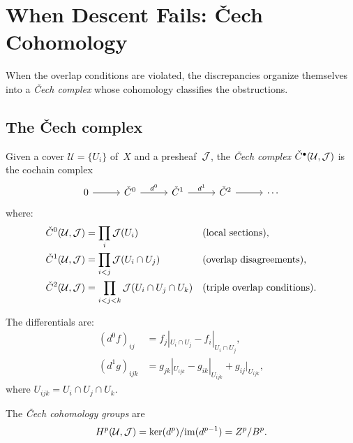 \documentclass[11pt]{article}
\begin{document}
\section{When Descent Fails: \v{C}ech Cohomology}\label{sec:cech}

When the overlap conditions are violated, the discrepancies organize
themselves into a \emph{\v{C}ech complex} whose cohomology classifies the
obstructions.

\subsection{The \v{C}ech complex}

\begin{definition}\label{def:cech}
Given a cover $\mathcal{U} = \{U_i\}$ of~$X$ and a presheaf~$\mathcal{J}$, the
\emph{\v{C}ech complex} $\check{C}^{\bullet}(\mathcal{U}, \mathcal{J})$ is the cochain
complex
\[
\begin{tikzcd}[column sep=2.8em]
0 \ar[r] &
\Cech^0 \ar[r, "d^0"] &
\Cech^1 \ar[r, "d^1"] &
\Cech^2 \ar[r] &
\cdots
\end{tikzcd}
\]
where:
\begin{align*}
\check{C}^0(\mathcal{U}, \mathcal{J}) &= \prod_{i} \mathcal{J}(U_i)
  && \text{(local sections)}, \\
\check{C}^1(\mathcal{U}, \mathcal{J}) &= \prod_{i < j} \mathcal{J}(U_i \cap U_j)
  && \text{(overlap disagreements)}, \\
\check{C}^2(\mathcal{U}, \mathcal{J}) &= \prod_{i < j < k} \mathcal{J}(U_i \cap U_j \cap U_k)
  && \text{(triple overlap conditions)}.
\end{align*}
\end{definition}

The differentials are:
\begin{align}
(d^0 f)_{ij} &= f_j|_{U_i \cap U_j} - f_i|_{U_i \cap U_j},
\label{eq:d0} \\
(d^1 g)_{ijk} &= g_{jk}|_{U_{ijk}} - g_{ik}|_{U_{ijk}} + g_{ij}|_{U_{ijk}},
\label{eq:d1}
\end{align}
where $U_{ijk} = U_i \cap U_j \cap U_k$.

\begin{definition}\label{def:cech-coh}
The \emph{\v{C}ech cohomology groups} are
\[
H^{p}(\mathcal{U}, \mathcal{J})
  = \ker(d^p) / \mathrm{im}(d^{p-1})
  = Z^p / B^p.
\]
\end{definition}
\end{document}
